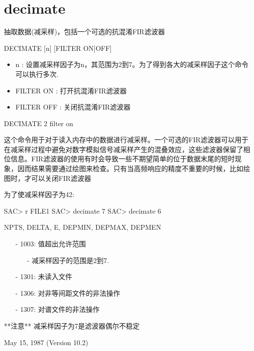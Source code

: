 \section{decimate}
\label{cmd:decimate}

抽取数据(减采样)，包括一个可选的抗混淆FIR滤波器

DECIMATE [n] [FILTER ON|OFF]

\begin{itemize}
\item n : 设置减采样因子为n，其范围为2到7。为了得到各大的减采样因子这个命令可以执行多次.
\item FILTER ON : 打开抗混淆FIR滤波器
\item FILTER OFF : 关闭抗混淆FIR滤波器
\end{itemize}

DECIMATE 2 filter on

这个命令用于对于读入内存中的数据进行减采样。一个可选的FIR滤波器可以用于在减采样过程中避免对数字模拟信号减采样产生的混叠效应，这些滤波器保留了相位信息。FIR滤波器的使用有时会导致一些不期望简单的位于数据末尾的短时现象，因而结果需要通过绘图来检查。只有当高频响应的精度不重要的时候，比如绘图时，才可以关闭FIR滤波器

为了使减采样因子为42:
\begin{SACCode}
SAC> r FILE1
SAC> decimate 7
SAC> decimate 6
\end{SACCode}

NPTS, DELTA, E, DEPMIN, DEPMAX, DEPMEN

\begin{itemize}
\item[-]1003: 值超出允许范围
	\begin{itemize}
  	\item[-]减采样因子的范围是2到7.
	\end{itemize}
\item[-]1301: 未读入文件
\item[-]1306: 对非等间距文件的非法操作
\item[-]1307: 对谱文件的非法操作
\end{itemize}
**注意** 减采样因子为7是滤波器偶尔不稳定

May 15, 1987 (Version 10.2)

